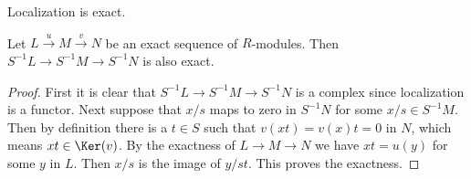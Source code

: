 \begin{proposition}
\label{proposition-localization-exact}
\begin{slogan}
Localization is exact.
\end{slogan}
Let $L\xrightarrow{u} M\xrightarrow{v} N$ be an exact sequence
of $R$-modules. Then
$S^{-1}L \to S^{-1}M \to S^{-1}N$ is also exact.
\end{proposition}

\begin{proof}
First it is clear that $S^{-1}L \to S^{-1}M \to S^{-1}N$ is a complex
since localization is a functor. Next suppose that $x/s$ maps to zero
in $S^{-1}N$ for some $x/s \in S^{-1}M$. Then by definition there is a
$t\in S$ such that $v(xt) = v(x)t = 0$ in $N$, which means
$xt \in \Ker(v)$. By the exactness of $L \to M \to N$ we have
$xt = u(y)$ for some $y$ in $L$. Then $x/s$ is the image of $y/st$.
This proves the exactness.
\end{proof}
